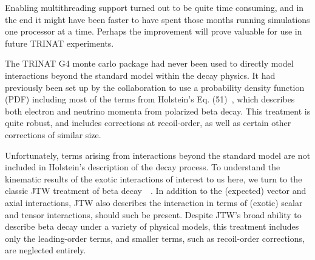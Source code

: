 Enabling multithreading support turned out to be quite time consuming, and in the end it might have been faster to have spent those months running simulations one processor at a time.  Perhaps the improvement will prove valuable for use in future TRINAT experiments.  

The TRINAT G4 monte carlo package had never been used to directly model interactions beyond the standard model within the decay physics.  
It had  previously been set up by the collaboration to use a probability density function (PDF) including most of the terms from Holstein's Eq. (51)~\cite{holstein}, which describes both electron and neutrino momenta from polarized beta decay.  This treatment is quite robust, and includes corrections at recoil-order, as well as certain other corrections of similar size.~

Unfortunately, terms arising from interactions beyond the standard model are not included in Holstein's description of the decay process.   To understand the kinematic results of the exotic interactions of interest to us here, we turn to the classic JTW treatment of beta decay~\cite{jtw}~\cite{jtw_coulomb}.  In addition to the (expected) vector and axial interactions, JTW also describes the interaction in terms of (exotic) scalar and tensor interactions, should such be present.  
Despite JTW's broad ability to describe beta decay under a variety of physical models, this treatment includes only the leading-order terms, and smaller terms, such as recoil-order corrections, are neglected entirely.  


